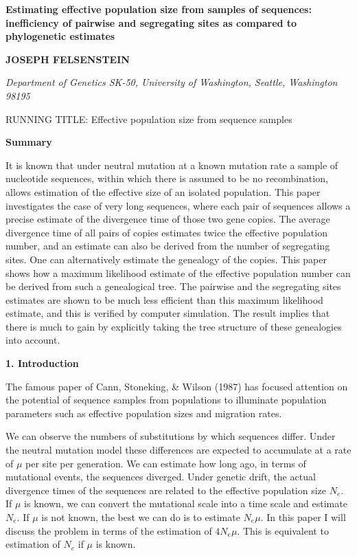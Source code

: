 \def\baselinestretch{1.5}

\begin{flushleft}
{\bf Estimating effective population size from samples of sequences:
inefficiency of pairwise and segregating sites as compared to phylogenetic estimates}
\bigskip

{\bf JOSEPH FELSENSTEIN}
\bigskip

{\it Department of Genetics SK-50, University of Washington, Seattle, Washington 98195}
\bigskip


RUNNING TITLE:  Effective population size from sequence samples
\end{flushleft}

\bigskip
{\bf Summary}

\medskip

\noindent
It is known that under neutral mutation at a known mutation rate a sample
of nucleotide
sequences, within which there is assumed to be no recombination, allows
estimation of the effective size of an isolated population.  This paper
investigates the case of very long sequences, where each pair of sequences
allows a precise estimate of the divergence time of those two gene copies.  The
average divergence
time of all pairs of copies estimates twice the effective population number,
and an estimate can also be derived from the number of segregating sites.
One can alternatively estimate the genealogy of the copies.  This paper shows
how a maximum likelihood estimate of the effective population number can
be derived from such a genealogical tree.  The pairwise and the
segregating sites estimates are
shown to be much less efficient than this maximum likelihood estimate,
and this is verified by computer simulation.  The result implies that
there is much to gain by explicitly taking the tree structure of these
genealogies into account.

\bigskip

\bigskip

{\bf 1. Introduction}

\noindent
The famous paper of Cann, Stoneking, \& Wilson (1987) has focused
attention on the potential of sequence samples from populations to
illuminate population parameters such as effective population sizes and
migration rates.  

We can observe the numbers of substitutions by which sequences differ.
Under the neutral mutation model these differences are expected to accumulate
at a rate of $\mu$ per site per generation.  We can estimate how long ago, in
terms of mutational events, the sequences diverged.  Under genetic
drift, the actual divergence times of the sequences are related to the
effective population size $N_e$.  If $\mu$ is known, we can convert the
mutational scale into a time scale and estimate $N_e$.  If $\mu$ is not
known, the best we can do is to estimate $N_e\mu$.  In this paper I will
discuss the problem in terms of the estimation of $4N_e\mu$.  This is
equivalent to estimation of $N_e$ if $\mu$ is known.

